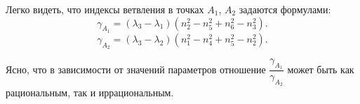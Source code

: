 Легко видеть, что индексы ветвления в точках $A_1$, $A_2$ задаются формулами:
$$\gamma_{A_1} = (\lambda_3 - \lambda_1)(n_2^2 - n_5^2 + n_6^2 - n_3^2).$$
$$\gamma_{A_2} = (\lambda_3 - \lambda_2)(n_1^2 - n_4^2 + n_5^2 - n_2^2).$$

Ясно, что в зависимости от значений параметров отношение $\dfrac{\gamma_{A_1}}{\gamma_{A_2}}$ может быть как рациональным, так и иррациональным.
\bigskip


\clearpage
